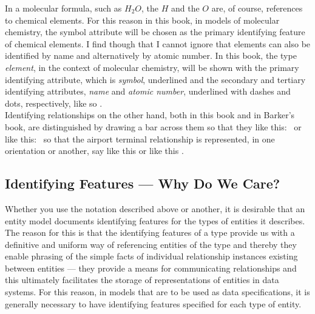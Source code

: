 \mynote
In a molecular formula, such as $H_2O$, the $H$ and the $O$ are, of course, references to chemical elements. For this reason in this book,
in models of molecular chemistry, the symbol attribute will be chosen as the primary identifying feature of chemical elements. I find though that I cannot ignore that elements can also be identified by name and alternatively by atomic number. 
In this book, the type \textit{element}, in the context of molecular chemistry, will be shown with the primary identifying attribute, which is \textit{symbol}, underlined and the secondary and tertiary identifying attributes, \textit{name} and \textit{atomic number}, underlined with dashes and dots, respectively, like so
\raisebox{-0.85cm}{\scalebox{0.95}{}}.\\
\vspace{0.2cm}
\mynote Identifying relationships on the other hand, both in this book and in Barker's book,
are distinguished by drawing a bar across them so that they like this: \barkerEllisJ\ or like this: \barkerEllisK\ so that the airport terminal relationship is represented, 
in one orientation or another, say like this
\raisebox{-1.4cm}{\scalebox{0.9}{}} 
or like this \raisebox{-0.45cm}{\scalebox{0.9}{}}.

\subsection{Identifying Features --- Why Do We Care?}
 Whether you use the notation 
described above or another, it is desirable that an entity model documents identifying features for the types of entities it describes. 
The reason for this is that the identifying features of a type
provide us with a definitive and uniform way of referencing entities of the type 
and thereby they enable phrasing of  the simple facts of individual relationship instances
existing between entities  
--- they provide a means for communicating  relationships and this ultimately facilitates the storage of representations of entities in data systems. For this reason, in models that are to be used as data specifications, it is generally necessary to have identifying features specified for each type of entity.  
